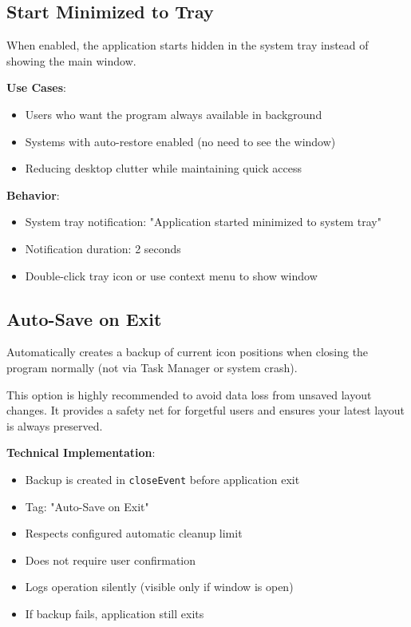 \documentclass[a4paper,11pt]{article}
\begin{document}
\subsection{Start Minimized to Tray}

When enabled, the application starts hidden in the system tray
instead of showing the main window.

\textbf{Use Cases}:
\begin{itemize}
  \item Users who want the program always available in background
  \item Systems with auto-restore enabled (no need to see the window)
  \item Reducing desktop clutter while maintaining quick access
\end{itemize}

\textbf{Behavior}:
\begin{itemize}
  \item System tray notification: "Application started minimized to system tray"
  \item Notification duration: 2 seconds
  \item Double-click tray icon or use context menu to show window
\end{itemize}

\subsection{Auto-Save on Exit}

Automatically creates a backup of current icon positions when closing
the program normally (not via Task Manager or system crash).

\begin{successbox}
  This option is highly recommended to avoid data loss from unsaved
  layout changes. It provides a safety net for forgetful users and
  ensures your latest layout is always preserved.
\end{successbox}

\textbf{Technical Implementation}:
\begin{itemize}
  \item Backup is created in \texttt{closeEvent} before application exit
  \item Tag: "Auto-Save on Exit"
  \item Respects configured automatic cleanup limit
  \item Does not require user confirmation
  \item Logs operation silently (visible only if window is open)
  \item If backup fails, application still exits
\end{itemize}
\end{document}
